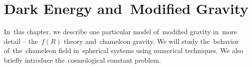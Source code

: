 \chapter{Dark Energy and~Modified Gravity}
\label{chpt:de_mg}
In~this chapter, we describe one particular model of~modified gravity in~more detail -- the~$f(R)$ theory and~chameleon gravity. We will study the~behavior of~the~chameleon field in~spherical systems using numerical techniques. We also briefly introduce the~cosmological constant problem.



% 



% 